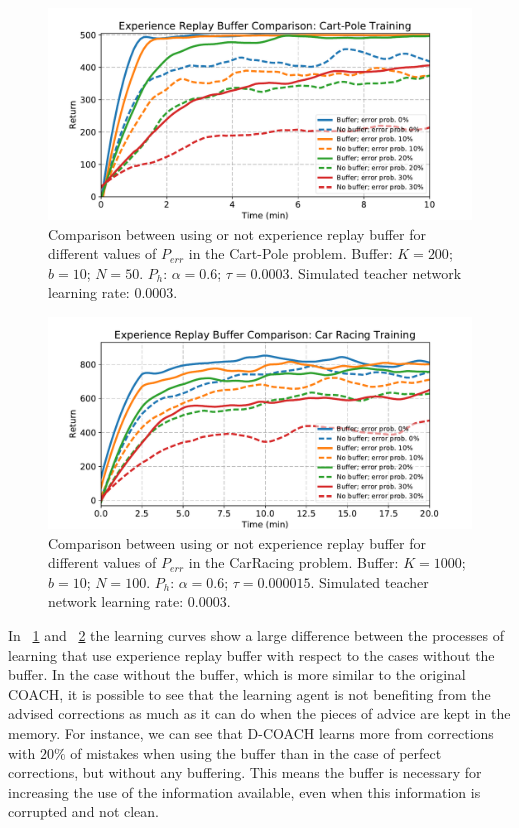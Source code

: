 \begin{figure}[t]
    \centering
    \includegraphics[width=0.9\linewidth]{imagenes/cap3/buffer_cart_pole.pdf}
    \caption{Comparison between using or not experience replay buffer for different values of $P_\mathit{err}$ in the Cart-Pole problem. Buffer: $K = 200$; $b = 10$; $N = 50$. $P_{h}$: $\alpha = 0.6$; $\tau = 0.0003$. Simulated teacher network learning rate: $0.0003$.}
    \label{fig:buffer_cart_pole}
\end{figure}

\begin{figure}[t]
    \centering
    \vspace{-0.2cm}
    \includegraphics[width=0.9\linewidth]{imagenes/cap3/bufferCarRacing.pdf}
    \vspace{-0.2cm}
    \caption{Comparison between using or not experience replay buffer for different values of $P_\mathit{err}$ in the CarRacing problem. Buffer: $K = 1000$; $b = 10$; $N = 100$. $P_{h}$: $\alpha = 0.6$; $\tau = 0.000015$. Simulated teacher network learning rate: $0.0003$.}
    \label{fig:buffer_car_racing}
\end{figure}

In \figurename~{\ref{fig:buffer_cart_pole}} and \figurename~{\ref{fig:buffer_car_racing}} the learning curves show a large difference between the processes of learning that use experience replay buffer with respect to the cases without the buffer. In the case without the buffer, which is more similar to the original COACH, it is possible to see that the learning agent is not benefiting from the advised corrections as much as it can do when the pieces of advice are kept in the memory. For instance, we can see that D-COACH learns more from corrections with $20 \%$ of mistakes when using the buffer than in the case of perfect corrections, but without any buffering. This means the buffer is necessary for increasing the use of the information available, even when this information is corrupted and not clean.

